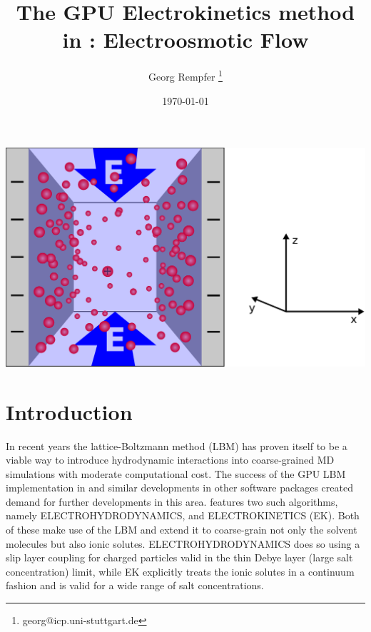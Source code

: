 \renewcommand{\d}{\mathrm d}
\subject{ESPResSo Tutorial}
\title{The GPU Electrokinetics method in \ES{}: 
Electroosmotic Flow
} \author{ Georg Rempfer \thanks{\ttfamily 
georg@icp.uni-stuttgart.de}}
\date{\today}
\publishers{Institute for Computational Physics, University of Stuttgart}
\maketitle 
\begin{center}
  \includegraphics[width=0.7\columnwidth]{figures/schlitzpore_3d.pdf}
\end{center}
\pagebreak
{}

 \tableofcontents
 \pagebreak
  
\section{Introduction}


In recent years the lattice-Boltzmann method (LBM) has proven itself to be a viable way to introduce hydrodynamic interactions into coarse-grained MD simulations with moderate computational cost. The success of the GPU LBM implementation in \ES{} and similar developments in other software packages created demand for further developments in this area. \ES{} features two such algorithms, namely ELECTROHYDRODYNAMICS, and ELECTROKINETICS (EK). Both of these make use of the LBM and extend it to coarse-grain not only the solvent molecules but also ionic solutes. ELECTROHYDRODYNAMICS does so using a slip layer coupling for charged particles valid in the thin Debye layer (large salt concentration) limit, while EK explicitly treats the ionic solutes in a continuum fashion and is valid for a wide range of salt concentrations.

